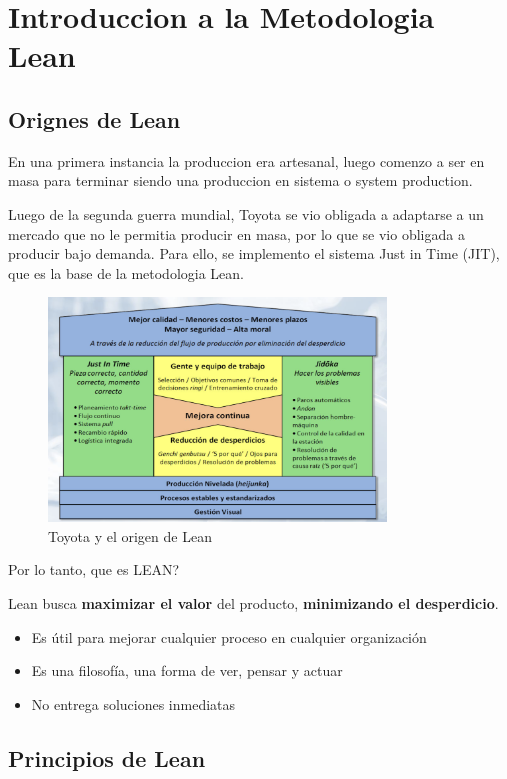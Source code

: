 \section{Introduccion a la Metodologia Lean}

\subsection{Orignes de Lean}

En una primera instancia la produccion era artesanal, luego comenzo a ser en masa para terminar siendo una produccion en sistema o system production.

Luego de la segunda guerra mundial, Toyota se vio obligada a adaptarse a un mercado que no le permitia producir en masa, por lo que se vio obligada a producir bajo demanda. Para ello, se implemento el sistema Just in Time (JIT), que es la base de la metodologia Lean.

\begin{figure}[H]
\centering
\includegraphics[width=0.8\textwidth]{IMAGENES/toyota.png}
\caption{Toyota y el origen de Lean}
\label{fig:lean}
\end{figure}

Por lo tanto, que es LEAN?

Lean busca \textbf{maximizar el valor} del producto, \textbf{minimizando el desperdicio}.

\begin{itemize}
    \item Es útil para mejorar cualquier proceso en cualquier organización
    \item Es una filosofía, una forma de ver, pensar y actuar
    \item No entrega soluciones inmediatas
\end{itemize}

\subsection{Principios de Lean}

